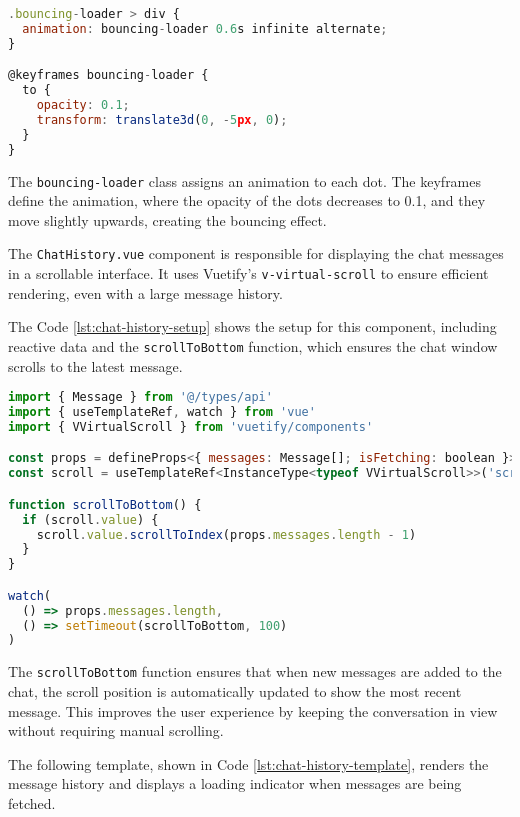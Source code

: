 \begin{lstlisting}[language=JavaScript, caption={Bouncing Loader Animation (\texttt{MessageLoadingAnimation.vue})},
firstnumber=18,label={lst:bouncing-loader-css}]
.bouncing-loader > div {
  animation: bouncing-loader 0.6s infinite alternate;
}

@keyframes bouncing-loader {
  to {
    opacity: 0.1;
    transform: translate3d(0, -5px, 0);
  }
}
\end{lstlisting}

The \texttt{bouncing-loader} class assigns an animation to each dot. The keyframes define the
animation, where the opacity of the dots decreases to 0.1, and they move slightly upwards, creating the bouncing effect.

The \texttt{ChatHistory.vue} component is responsible for displaying the chat messages in a scrollable interface.
It uses Vuetify’s \texttt{v-virtual-scroll} to ensure efficient rendering, even with a large message history.

The Code  \ref{lst:chat-history-setup} shows the setup for this component, including reactive
data and the \texttt{scrollToBottom} function, which ensures the chat window scrolls to the latest message.

\begin{lstlisting}[language=JavaScript, caption={Setup and Scroll Functionality (\texttt{ChatHistory.vue})},
  firstnumber=2,label={lst:chat-history-setup}]
import { Message } from '@/types/api'
import { useTemplateRef, watch } from 'vue'
import { VVirtualScroll } from 'vuetify/components'

const props = defineProps<{ messages: Message[]; isFetching: boolean }>()
const scroll = useTemplateRef<InstanceType<typeof VVirtualScroll>>('scroll')

function scrollToBottom() {
  if (scroll.value) {
    scroll.value.scrollToIndex(props.messages.length - 1)
  }
}

watch(
  () => props.messages.length,
  () => setTimeout(scrollToBottom, 100)
)
\end{lstlisting}

The \texttt{scrollToBottom} function ensures that when new messages are added
to the chat, the scroll position is automatically updated to show the most recent message. This improves the user
experience by keeping the conversation in view without requiring manual scrolling.

The following template, shown in Code \ref{lst:chat-history-template}, renders the message history and displays
a loading indicator when messages are being fetched.

